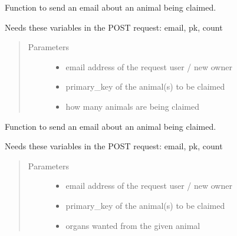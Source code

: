 \documentclass[letterpaper,10pt,openany,oneside,english]{sphinxmanual}
\begin{document}
\begin{fulllineitems}
\label{\detokenize{index:animals.views.send_email_animal}}
Function to send an email about an animal being claimed.

Needs these variables in the POST request: email, pk, count
\begin{quote}\begin{description}
\item[{Parameters}] \leavevmode\begin{itemize}
\item {} 
 \textendash{} email address of the request user / new owner

\item {} 
 \textendash{} primary\_key of the animal(s) to be claimed

\item {} 
 \textendash{} how many animals are being claimed

\end{itemize}

\end{description}\end{quote}

\end{fulllineitems}


\begin{fulllineitems}
\label{\detokenize{index:animals.views.send_email_organ}}
Function to send an email about an animal being claimed.

Needs these variables in the POST request: email, pk, count
\begin{quote}\begin{description}
\item[{Parameters}] \leavevmode\begin{itemize}
\item {} 
 \textendash{} email address of the request user / new owner

\item {} 
 \textendash{} primary\_key of the animal(s) to be claimed

\item {} 
 \textendash{} organs wanted from the given animal

\end{itemize}

\end{description}\end{quote}

\end{fulllineitems}
\end{document}
